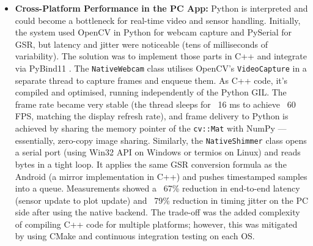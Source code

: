 \begin{itemize}
	\item \textbf{Cross-Platform Performance in the PC App:} Python is interpreted and could become a bottleneck for real-time video and sensor handling. Initially, the system used OpenCV \cite{ref22} in Python for webcam capture and PySerial for GSR, but latency and jitter were noticeable (tens of milliseconds of variability). The solution was to implement those parts in C++ and integrate via PyBind11 \cite{ref18}. The \texttt{NativeWebcam} class utilises OpenCV's \cite{ref22} \texttt{VideoCapture} in a separate thread to capture frames and enqueue them. As C++ code, it's compiled and optimised, running independently of the Python GIL. The frame rate became very stable (the thread sleeps for ~16 ms to achieve ~60 FPS, matching the display refresh rate), and frame delivery to Python is achieved by sharing the memory pointer of the \texttt{cv::Mat} with NumPy — essentially, zero-copy image sharing. Similarly, the \texttt{NativeShimmer} class opens a serial port (using Win32 API on Windows or termios on Linux) and reads bytes in a tight loop. It applies the same GSR conversion formula as the Android (a mirror implementation in C++) and pushes timestamped samples into a queue. Measurements showed a ~67\% reduction in end-to-end latency (sensor update to plot update) and ~79\% reduction in timing jitter on the PC side after using the native backend. The trade-off was the added complexity of compiling C++ code for multiple platforms; however, this was mitigated by using CMake and continuous integration testing on each OS.

\end{itemize}
